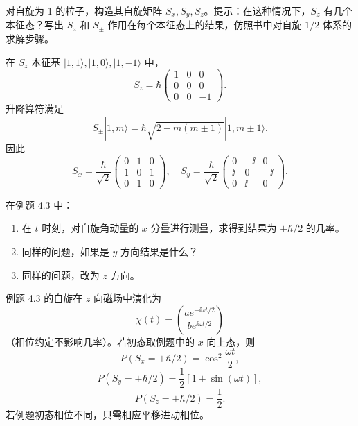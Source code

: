 \begin{question}
对自旋为 1 的粒子，构造其自旋矩阵 $S_x,S_y,S_z$。提示：在这种情况下，$S_z$ 有几个本征态？写出 $S_z$ 和 $S_\pm$ 作用在每个本征态上的结果，仿照书中对自旋 $1/2$ 体系的求解步骤。
\end{question}
\begin{solution}

在 $S_z$ 本征基 $|1,1\rangle,|1,0\rangle,|1,-1\rangle$ 中，
\[
S_z=\hbar\begin{pmatrix}1&0&0\\0&0&0\\0&0&-1\end{pmatrix}.
\]
升降算符满足
\[
S_\pm|1,m\rangle=\hbar\sqrt{2-m(m\pm1)}|1,m\pm1\rangle.
\]
因此
\[
S_x=\frac\hbar{\sqrt2}\begin{pmatrix}0&1&0\\1&0&1\\0&1&0\end{pmatrix},
\quad
S_y=\frac\hbar{\sqrt2}\begin{pmatrix}0&-\ii&0\\\ii&0&-\ii\\0&\ii&0\end{pmatrix}.
\]

\end{solution}

\begin{question}
在例题 4.3 中：
\begin{enumerate}
\item 在 $t$ 时刻，对自旋角动量的 $x$ 分量进行测量，求得到结果为 $+\hbar/2$ 的几率。
\item 同样的问题，如果是 $y$ 方向结果是什么？
\item 同样的问题，改为 $z$ 方向。
\end{enumerate}
\end{question}
\begin{solution}

例题 4.3 的自旋在 $z$ 向磁场中演化为
\[
\chi(t)=\binom{a e^{-\ii\omega t/2}}{b e^{\ii\omega t/2}}
\]
（相位约定不影响几率）。若初态取例题中的 $x$ 向上态，则
\[
P(S_x=+\hbar/2)=\cos^2\frac{\omega t}{2},
\]
\[
P(S_y=+\hbar/2)=\frac12[1+\sin(\omega t)],
\]
\[
P(S_z=+\hbar/2)=\frac12.
\]
若例题初态相位不同，只需相应平移进动相位。

\end{solution}

